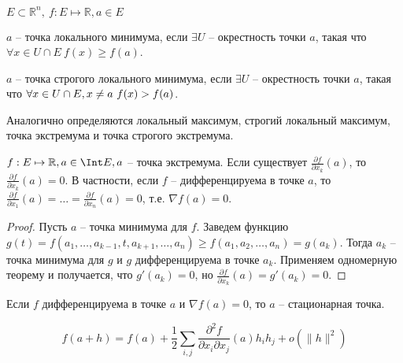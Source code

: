 \begin{definition} \thmslashn

	$E \subset \mathbb{R}^n,\ f : E \mapsto \mathbb{R}, a \in E$
	
	$a$ -- точка локального минимума, если $\exists U$ -- окрестность точки $a$, такая что $\forall x \in U \cap E\ f(x) \ge f(a)$.
	
	$a$ -- точка строгого локального минимума, если $\exists U$ -- окрестность точки $a$, такая что $\forall x \in U \cap E,\\x \neq a\ f(x) > f(a)$. 
	
	Аналогично определяются локальный максимум, строгий локальный максимум, точка экстремума и точка строгого экстремума.
\end{definition}

\begin{theorem} \thmslashn

	$f : E \mapsto \mathbb{R}, a \in \Int E, a$ -- точка экстремума. Если существует $\frac{\partial f}{\partial x_k}(a)$, то $\frac{\partial f}{\partial x_k}(a) = 0$. В частности, если $f$ -- дифференцируема в точке $a$, то $\frac{\partial f}{\partial x_1}(a) = \dots = \frac{\partial f}{\partial x_n}(a) = 0$, т.е. $\nabla f(a) = 0$.
	\begin{proof} \thmslashn
		
		Пусть $a$ -- точка минимума для $f$. Заведем функцию $g(t) = f(a_1, \dots, a_{k - 1}, t, a_{k + 1}, \dots, a_n) \ge f(a_1, a_2, \dots, a_n) = g(a_k)$. Тогда $a_k$ -- точка минимума для $g$ и $g$ дифференцируема в точке $a_k$. Применяем одномерную теорему и получается, что $g'(a_k) = 0$, но $\frac{\partial f}{\partial x_k}(a) = g'(a_k) = 0$.
	\end{proof}
\end{theorem}

\begin{definition} \thmslashn
	
	Если $f$ дифференцируема в точке $a$ и $\nabla f(a) = 0$, то $a$ -- стационарная точка.
\end{definition}

\begin{remark} \thmslashn

	\[
	f(a + h) = f(a) + \frac{1}{2}\sum_{i, j}\frac{\partial^2f}{\partial x_i \partial x_j}(a)h_ih_j + o(\|h\|^2)
	\]
\end{remark}